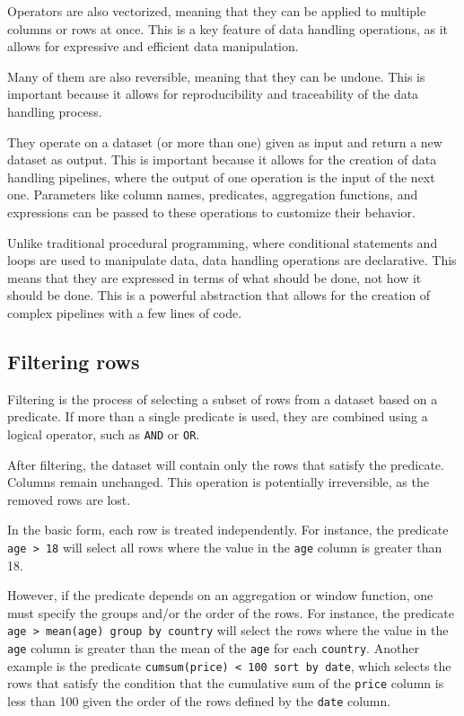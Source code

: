 Operators are also vectorized, meaning that they can be applied to multiple columns or
rows at once.  This is a key feature of data handling operations, as it allows for
expressive and efficient data manipulation.

Many of them are also reversible, meaning that they can be undone.  This is important
because it allows for reproducibility and traceability of the data handling process.

They operate on a dataset (or more than one) given as input and return a new dataset as
output.  This is important because it allows for the creation of data handling pipelines,
where the output of one operation is the input of the next one.  Parameters like column
names, predicates, aggregation functions, and expressions can be passed to these operations to
customize their behavior.

Unlike traditional procedural programming, where conditional statements and loops are used
to manipulate data, data handling operations are declarative.  This means that they are
expressed in terms of what should be done, not how it should be done.  This is a powerful
abstraction that allows for the creation of complex pipelines with a few lines of code.

\subsection{Filtering rows}

Filtering is the process of selecting a subset of rows from a dataset based on a
predicate.  If more than a single predicate is used, they are combined using a logical
operator, such as \texttt{AND} or \texttt{OR}.

After filtering, the dataset will contain only the rows that satisfy the predicate.
Columns remain unchanged.  This operation is potentially irreversible, as the removed
rows are lost.

In the basic form, each row is treated independently.  For instance, the predicate
\texttt{age > 18} will select all rows where the value in the \texttt{age} column is
greater than 18.

However, if the predicate depends on an aggregation or window function, one must specify
the groups and/or the order of the rows.  For instance, the predicate \texttt{age >
mean(age) group by country} will select the rows where the value in the \texttt{age}
column is greater than the mean of the \texttt{age} for each \texttt{country}. Another
example is the predicate \texttt{cumsum(price) < 100 sort by date}, which selects the rows
that satisfy the condition that the cumulative sum of the \texttt{price} column is less
than 100 given the order of the rows defined by the \texttt{date} column.

